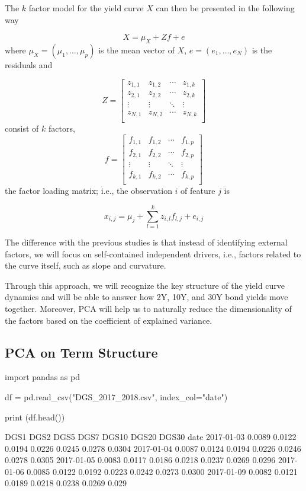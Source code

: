 The $k$ factor model for the yield curve $X$ can then be presented in the following way

$$
X = \mu_ X + Zf + e
$$
where $\mu_X = (\mu_1,\ldots, \mu_p)$ is the mean vector of $X$, $e = (e_1,\ldots, e_N )$ is the residuals and

$$
Z =
\begin{bmatrix}
	z_{1,1} & z_{1,2} & \cdots & z_{1,k} \\
	z_{2,1} & z_{2,2} & \cdots & z_{2,k} \\
	\vdots & \vdots & \ddots & \vdots \\
	z_{N,1} & z_{N,2} & \cdots & z_{N,k} \\
\end{bmatrix}
$$
consist of $k$ factors,
$$
f =
\begin{bmatrix}
	f_{1,1} & f_{1,2} & \cdots & f_{1,p} \\
	f_{2,1} & f_{2,2} & \cdots & f_{2,p} \\
	\vdots & \vdots & \ddots & \vdots \\
	f_{k,1} & f_{k,2} & \cdots & f_{k,p} \\
\end{bmatrix}
$$
the factor loading matrix; i.e., the observation $i$ of feature $j$ is

$$
x_{i,j} = \mu_j + \sum_{l=1}^k z_{i,l}f_{l,j} + e_{i,j}
$$

The difference with the previous studies is that instead of identifying external factors, we will focus on self-contained independent drivers, i.e., factors related to the curve itself, such as slope and curvature.

Through this approach, we will recognize the key structure of the yield curve dynamics and will be able to answer how 2Y, 10Y, and 30Y bond yields move together. Moreover, PCA will help us to naturally reduce the dimensionality of the factors based on the coefficient of explained variance.

\subsection{PCA on Term Structure}

\begin{ipython}
import pandas as pd

df = pd.read_csv("DGS_2017_2018.csv", index_col="date")

print (df.head())
\end{ipython}
\begin{ioutput}
DGS1    DGS2    DGS5    DGS7   DGS10   DGS20   DGS30
date                                                              
2017-01-03  0.0089  0.0122  0.0194  0.0226  0.0245  0.0278  0.0304
2017-01-04  0.0087  0.0124  0.0194  0.0226  0.0246  0.0278  0.0305
2017-01-05  0.0083  0.0117  0.0186  0.0218  0.0237  0.0269  0.0296
2017-01-06  0.0085  0.0122  0.0192  0.0223  0.0242  0.0273  0.0300
2017-01-09  0.0082  0.0121  0.0189  0.0218  0.0238  0.0269  0.029
\end{ioutput}

